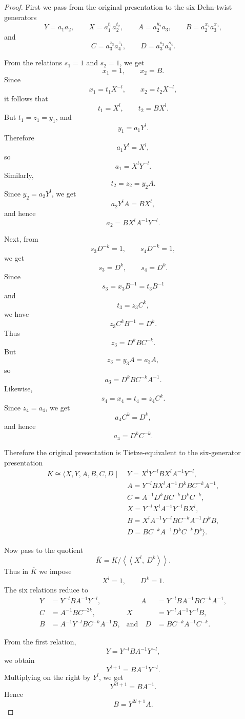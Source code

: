 \documentclass[10pt,a4paper]{amsart}
\begin{document}
\begin{proof}

First we pass from the original presentation to the six Dehn-twist generators
\[
Y=a_1a_2,\qquad
X=a_1^{t_1}a_2^{t_2},\qquad
A=a_2^{y_2}a_3,\qquad
B=a_2^{x_2}a_3^{x_3},
\]
and
\[
C=a_3^{z_3}a_4^{z_4},
\qquad
D=a_3^{s_3}a_4^{s_4}.
\]

From the relations \(s_1=1\) and \(s_2=1\), we get
\[
x_1=1,\qquad x_2=B.
\]
Since
\[
x_1=t_1X^{-l},\qquad x_2=t_2X^{-l},
\]
it follows that
\[
t_1=X^l,\qquad t_2=BX^l.
\]
But \(t_1=z_1=y_1\), and
\[
y_1=a_1Y^l.
\]
Therefore
\[
a_1Y^l=X^l,
\]
so
\[
a_1=X^lY^{-l}.
\]
Similarly,
\[
t_2=z_2=y_2A.
\]
Since \(y_2=a_2Y^l\), we get
\[
a_2Y^lA=BX^l,
\]
and hence
\[
a_2=BX^lA^{-1}Y^{-l}.
\]

Next, from
\[
s_3D^{-k}=1,\qquad s_4D^{-k}=1,
\]
we get
\[
s_3=D^k,\qquad s_4=D^k.
\]
Since
\[
s_3=x_3B^{-1}=t_3B^{-1}
\]
and
\[
t_3=z_3C^k,
\]
we have
\[
z_3C^kB^{-1}=D^k.
\]
Thus
\[
z_3=D^kBC^{-k}.
\]
But
\[
z_3=y_3A=a_3A,
\]
so
\[
a_3=D^kBC^{-k}A^{-1}.
\]
Likewise,
\[
s_4=x_4=t_4=z_4C^k.
\]
Since \(z_4=a_4\), we get
\[
a_4C^k=D^k,
\]
and hence
\[
a_4=D^kC^{-k}.
\]

Therefore the original presentation is Tietze-equivalent to the
six-generator presentation
\[
\begin{aligned}
K\cong
\langle X,Y,A,B,C,D \mid\;&
Y=X^lY^{-l}BX^lA^{-1}Y^{-l},\\
&
A=Y^{-l}BX^lA^{-1}D^kBC^{-k}A^{-1},\\
&
C=A^{-1}D^kBC^{-k}D^kC^{-k},\\
&
X=Y^{-l}X^lA^{-1}Y^{-l}BX^l,\\
&
B=X^lA^{-1}Y^{-l}BC^{-k}A^{-1}D^kB,\\
&
D=BC^{-k}A^{-1}D^kC^{-k}D^k
\rangle .
\end{aligned}
\]

Now pass to the quotient
\[
\overline K
=
K/\left\langle\!\left\langle X^l,\ D^k\right\rangle\!\right\rangle .
\]
Thus in \(\overline K\) we impose
\[
X^l=1,\qquad D^k=1.
\]
The six relations reduce to
\[
\begin{aligned}
Y&=Y^{-l}BA^{-1}Y^{-l},&\qquad
A&=Y^{-l}BA^{-1}BC^{-k}A^{-1},\\
C&=A^{-1}BC^{-2k},&
X&=Y^{-l}A^{-1}Y^{-l}B,\\
B&=A^{-1}Y^{-l}BC^{-k}A^{-1}B,&
\text{and}\quad D&=BC^{-k}A^{-1}C^{-k}.
\end{aligned}
\]

From the first relation,
\[
Y=Y^{-l}BA^{-1}Y^{-l},
\]
we obtain
\[
Y^{l+1}=BA^{-1}Y^{-l}.
\]
Multiplying on the right by \(Y^l\), we get
\[
Y^{2l+1}=BA^{-1}.
\]
Hence
\[
B=Y^{2l+1}A.
\]


\end{proof}
\end{document}
